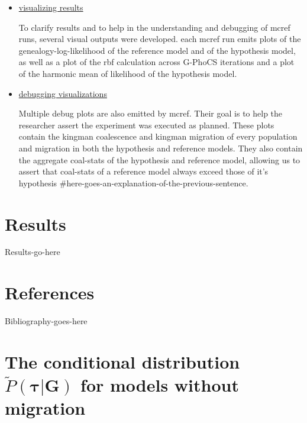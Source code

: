 \documentclass[11pt]{article}
\newcommand{\vect}[1]{\boldsymbol{\mathbf{#1}}}
\newcommand{\Tr}{\mathcal{T}}
\newcommand{\G}{\vect{G}}
\newcommand{\Pref}{\widetilde{P}}
\newcommand{\1}{\mathbbm{1}}
\newcommand{\gp}{G-PhoCS }
\newcommand{\taus}{\vect\tau}
\begin{document}
\begin{itemize}
\item \underline{visualizing results}

To clarify results and to help in the understanding and debugging of mcref runs, several visual outputs were developed. each mcref run emits plots of the genealogy-log-likelihood of the reference model and of the hypothesis model, as well as a plot of the rbf calculation across \gp iterations and a plot of the harmonic mean of likelihood of the hypothesis model.

\item \underline{debugging visualizations}

Multiple debug plots are also emitted by mcref. Their goal is to help the researcher assert the experiment was executed as planned. These plots contain the kingman coalescence and kingman migration of every population and migration in both the hypothesis and reference models. They also contain the aggregate coal-stats of the hypothesis and reference model, allowing us to assert that coal-stats of a reference model always exceed those of it's hypothesis \#here-goes-an-explanation-of-the-previous-sentence. 
\end{itemize}



\section{Results}
Results-go-here

\newpage

\section{References}
Bibliography-goes-here


\newpage


\appendix
\newcommand{\anc}{\geq_\Tr}
\newcommand{\nanc}{\ngeq_\Tr}

\section{\texorpdfstring{The conditional distribution $\Pref(\taus|\G)$ for models without migration}{Conditional distribution without migration}}\label{ap:cond_nomig}
\end{document}
